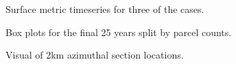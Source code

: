 \begin{figure}
	\caption{Surface metric timeseries for three of the cases.}
	\label{fig:np_surfmetrics}
\end{figure}

\begin{figure}[!ht]
	\caption{Box plots for the final 25 years split by parcel counts.}
	\label{fig:np_boxplots}
\end{figure}

\begin{figure}[!ht]
	\caption{Visual of 2km azimuthal section locations.}
	\label{fig:np_radial}
\end{figure}

